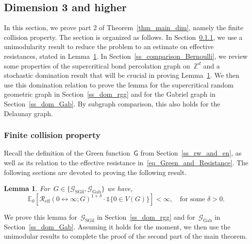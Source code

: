 \documentclass[a4paper,11pt]{article}
\newcommand{\EE}{\mathbb{E}}
\newcommand{\ZZ}{\mathbb{Z}}
\newtheorem{lemma}{Lemma}
\theoremstyle{definition}
\begin{document}
\subsection{Dimension 3 and higher}\label{ss_dim_3}
In this section, we prove part 2 of Theorem~\ref{thm_main_dim}, namely the finite collision property. The section is organized as follows. In Section~\ref{ss_FCP_dim3_pre}, we use a unimodularity result to reduce the problem to an estimate on effective resistances, stated in Lemma~\ref{lemma_r_eff_Gil_Gab}. In Section~\ref{ss_comparison_Bernoulli}, we review some properties of the supercritical bond percolation graph on~$\ZZ^d$ and a stochastic domination result that will be crucial in proving Lemma~\ref{lemma_r_eff_Gil_Gab}. We then use this domination relation to prove the lemma for the supercritical random geometric graph in Section~\ref{ss_dom_rgg} and for the Gabriel graph in Section~\ref{ss_dom_Gab}. By subgraph comparison, this also holds for the Delaunay graph.

\subsubsection{Finite collision property}\label{ss_FCP_dim3_pre}
Recall the definition of the Green function~$\mathsf G$ from Section~\ref{ss_rw_and_en}, as well as its relation to the effective resistance in~\eqref{eq_Green_and_Resistance}. The following sections are devoted to proving the following result.

\begin{lemma}\label{lemma_r_eff_Gil_Gab}
For~$G \in \{\mathcal G_\mathrm{SGil},\mathcal G_\mathrm{Gab} \}$ we have,
\begin{equation}\label{eq_R_eff_1+delta}
\EE_0 [ \mathcal R_\mathrm{eff}(0 \leftrightarrow \infty;G )^{1+\delta} \cdot \mathds{1}\{ 0 \in V(G) \} ] < \infty, \quad \text{for some } \delta > 0.
\end{equation}
\end{lemma}
We prove this lemma for~$\mathcal G_\mathrm{SGil}$ in Section~\ref{ss_dom_rgg} and for~$\mathcal G_\mathrm{Gab}$ in Section~\ref{ss_dom_Gab}. Assuming it holds for the moment, we then use the unimodular results to complete the proof of the second part of the main theorem.
\end{document}

